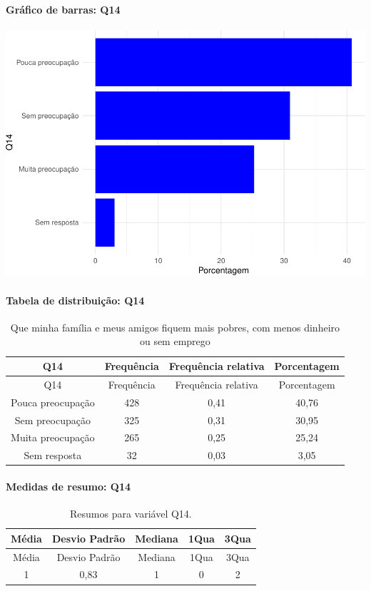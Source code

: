 \documentclass[]{article}
\let\oldparagraph\paragraph
\renewcommand{\paragraph}[1]{\oldparagraph{#1}\mbox{}}
\begin{document}
\hypertarget{gruxe1fico-de-barras-q14}{%
\paragraph{Gráfico de barras: Q14}\label{gruxe1fico-de-barras-q14}}

\begin{center}\includegraphics[width=0.75\linewidth]{relatorio_covid19_files/figure-latex/unnamed-chunk-10-1} \end{center}

\hypertarget{tabela-de-distribuiuxe7uxe3o-q14}{%
\paragraph{Tabela de distribuição: Q14}\label{tabela-de-distribuiuxe7uxe3o-q14}}

\begin{longtable}[]{@{}cccc@{}}
\caption{\label{tab:unnamed-chunk-11}Que minha família e meus amigos fiquem mais pobres, com menos dinheiro ou sem emprego}\tabularnewline
\toprule
Q14 & Frequência & Frequência relativa & Porcentagem\tabularnewline
\midrule
\endfirsthead
\toprule
Q14 & Frequência & Frequência relativa & Porcentagem\tabularnewline
\midrule
\endhead
Pouca preocupação & 428 & 0,41 & 40,76\tabularnewline
Sem preocupação & 325 & 0,31 & 30,95\tabularnewline
Muita preocupação & 265 & 0,25 & 25,24\tabularnewline
Sem resposta & 32 & 0,03 & 3,05\tabularnewline
\bottomrule
\end{longtable}

\hypertarget{medidas-de-resumo-q14}{%
\paragraph{Medidas de resumo: Q14}\label{medidas-de-resumo-q14}}

\begin{longtable}[]{@{}ccccc@{}}
\caption{\label{tab:unnamed-chunk-12}Resumos para variável Q14.}\tabularnewline
\toprule
Média & Desvio Padrão & Mediana & 1Qua & 3Qua\tabularnewline
\midrule
\endfirsthead
\toprule
Média & Desvio Padrão & Mediana & 1Qua & 3Qua\tabularnewline
\midrule
\endhead
1 & 0,83 & 1 & 0 & 2\tabularnewline
\bottomrule
\end{longtable}
\end{document}

